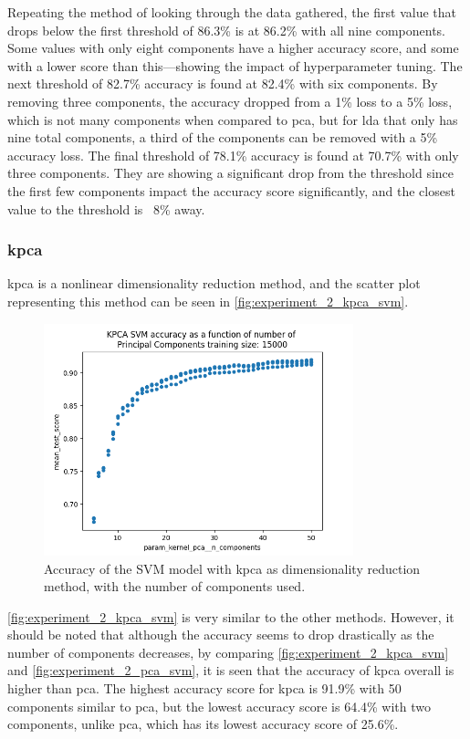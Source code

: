 Repeating the method of looking through the data gathered, the first value that drops below the first threshold of 86.3\% is at 86.2\% with all nine components. Some values with only eight components have a higher accuracy score, and some with a lower score than this—showing the impact of hyperparameter tuning.
The next threshold of 82.7\% accuracy is found at 82.4\% with six components. By removing three components, the accuracy dropped from a 1\% loss to a 5\% loss, which is not many components when compared to \gls{pca}, but for \gls{lda} that only has nine total components, a third of the components can be removed with a 5\% accuracy loss.
The final threshold of 78.1\% accuracy is found at 70.7\% with only three components. They are showing a significant drop from the threshold since the first few components impact the accuracy score significantly, and the closest value to the threshold is ~8\% away.


\subsubsection{\gls{kpca}}\label{subsubsec:experiment_2_kpca}
\gls{kpca} is a nonlinear dimensionality reduction method, and the scatter plot representing this method can be seen in \autoref{fig:experiment_2_kpca_svm}.

\begin{figure}[htb!]
    \centering
    \includegraphics[width=0.8\textwidth]{figures/experiment_two/kpca_svm_15000.png}
    \caption{Accuracy of the SVM model with \gls{kpca} as dimensionality reduction method, with the number of components used.}
    \label{fig:experiment_2_kpca_svm}
\end{figure}

\autoref{fig:experiment_2_kpca_svm} is very similar to the other methods. However, it should be noted that although the accuracy seems to drop drastically as the number of components decreases, by comparing \autoref{fig:experiment_2_kpca_svm} and \autoref{fig:experiment_2_pca_svm}, it is seen that the accuracy of \gls{kpca} overall is higher than \gls{pca}. The highest accuracy score for \gls{kpca} is 91.9\% with 50 components similar to \gls{pca}, but the lowest accuracy score is 64.4\% with two components, unlike \gls{pca}, which has its lowest accuracy score of 25.6\%.

